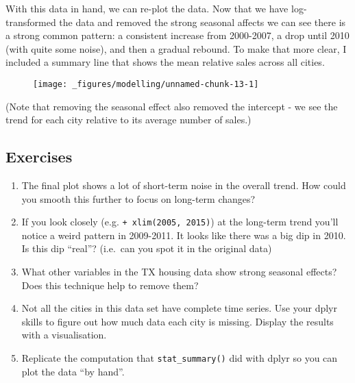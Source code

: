 With this data in hand, we can re-plot the data. Now that we have
log-transformed the data and removed the strong seasonal affects we can
see there is a strong common pattern: a consistent increase from
2000-2007, a drop until 2010 (with quite some noise), and then a gradual
rebound. To make that more clear, I included a summary line that shows
the mean relative sales across all cities.

\begin{Shaded}
\begin{Highlighting}[]
\StringTok{  }\NormalTok{(}\NormalTok{(}  \NormalTok{/}\NormalTok{) +}\StringTok{ }
\StringTok{  }\NormalTok{(} \NormalTok{, } \NormalTok{, } \NormalTok{)}
\end{Highlighting}
\end{Shaded}

\begin{figure}[H]
  \texttt{[image: \_figures/modelling/unnamed-chunk-13-1]}
\end{figure}

(Note that removing the seasonal effect also removed the intercept - we
see the trend for each city relative to its average number of sales.)

\subsection{Exercises}

\begin{enumerate}
\def\labelenumi{\arabic{enumi}.}
\item
  The final plot shows a lot of short-term noise in the overall trend.
  How could you smooth this further to focus on long-term changes?
\item
  If you look closely (e.g. \texttt{+\ xlim(2005,\ 2015)}) at the
  long-term trend you'll notice a weird pattern in 2009-2011. It looks
  like there was a big dip in 2010. Is this dip ``real''? (i.e.~can you
  spot it in the original data)
\item
  What other variables in the TX housing data show strong seasonal
  effects? Does this technique help to remove them?
\item
  Not all the cities in this data set have complete time series. Use
  your dplyr skills to figure out how much data each city is missing.
  Display the results with a visualisation.
\item
  Replicate the computation that \texttt{stat\_summary()} did with dplyr
  so you can plot the data ``by hand''.
\end{enumerate}

